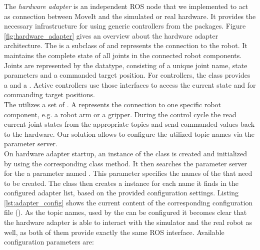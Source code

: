 The \emph{hardware adapter} is an independent ROS node that we implemented to act as connection between MoveIt and the simulated or real hardware. It provides the necessary infrastructure for using generic controllers from the  packages. Figure \ref{fig:hardware_adapter} gives an overview about the hardware adapter architecture. The  is a subclass of  and represents the connection to the robot. It maintains the complete state of all joints in the connected robot components. Joints are represented by the  datatype, consisting of a unique joint name, state parameters and a commanded target position. For controllers, the  class provides a  and a . Active controllers use those interfaces to access the current state and for commanding target positions. \\ 

The  utilizes a set of . A  represents the connection to one specific robot component, e.g. a robot arm or a gripper. During the control cycle the  read current joint states from the appropriate topics and send commanded values back to the hardware. Our solution allows to configure the utilized topic names via the parameter server.\\

On hardware adapter startup, an instance of the  class is created and initialized by using the corresponding class method. It then searches the parameter server for the a parameter named . This parameter specifies the names of the  that need to be created. The  class then creates a  instance for each name it finds in the configured adapter list, based on the provided configuration settings. Listing \ref{lst:adapter_config} shows the current content of the corresponding configuration file (). As the topic names, used by the  can be configured it becomes clear that the hardware adapter is able to interact with the simulator and the real robot as well, as both of them provide exactly the same ROS interface. Available configuration parameters are:

